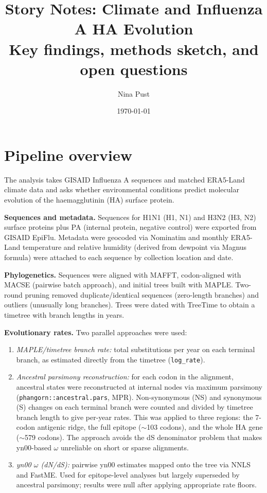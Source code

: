 \documentclass[11pt, a4paper]{article}
\title{\textbf{Story Notes: Climate and Influenza A HA Evolution}\\
\large Key findings, methods sketch, and open questions}
\author{Nina Pust}
\date{\today}
\begin{document}
\maketitle

\section*{Pipeline overview}

The analysis takes GISAID Influenza A sequences and matched ERA5-Land climate
data and asks whether environmental conditions predict molecular evolution of
the haemagglutinin (HA) surface protein.

\textbf{Sequences and metadata.}
Sequences for H1N1 (H1, N1) and H3N2 (H3, N2) surface proteins plus PA
(internal protein, negative control) were exported from GISAID EpiFlu.
Metadata were geocoded via Nominatim and monthly ERA5-Land temperature and
relative humidity (derived from dewpoint via Magnus formula) were attached to
each sequence by collection location and date.

\textbf{Phylogenetics.}
Sequences were aligned with MAFFT, codon-aligned with MACSE (pairwise
batch approach), and initial trees built with MAPLE.
Two-round pruning removed duplicate/identical sequences (zero-length branches)
and outliers (unusually long branches).
Trees were dated with TreeTime to obtain a timetree with branch lengths in
years.

\textbf{Evolutionary rates.}
Two parallel approaches were used:
\begin{enumerate}
  \item \textit{MAPLE/timetree branch rate:} total substitutions per year on
        each terminal branch, as estimated directly from the timetree
        (\texttt{log\_rate}).
  \item \textit{Ancestral parsimony reconstruction:} for each codon in the
        alignment, ancestral states were reconstructed at internal nodes via
        maximum parsimony (\texttt{phangorn::ancestral.pars}, MPR).
        Non-synonymous (NS) and synonymous (S) changes on each terminal branch
        were counted and divided by timetree branch length to give per-year
        rates. This was applied to three regions: the 7-codon antigenic ridge,
        the full epitope ($\sim$103 codons), and the whole HA gene
        ($\sim$579 codons). The approach avoids the dS denominator problem that
        makes yn00-based $\omega$ unreliable on short or sparse alignments.
  \item \textit{yn00 $\omega$ (dN/dS):} pairwise yn00 estimates mapped onto
        the tree via NNLS and FastME. Used for epitope-level analyses but
        largely superseded by ancestral parsimony; results were null after
        applying appropriate rate floors.
\end{enumerate}
\end{document}
